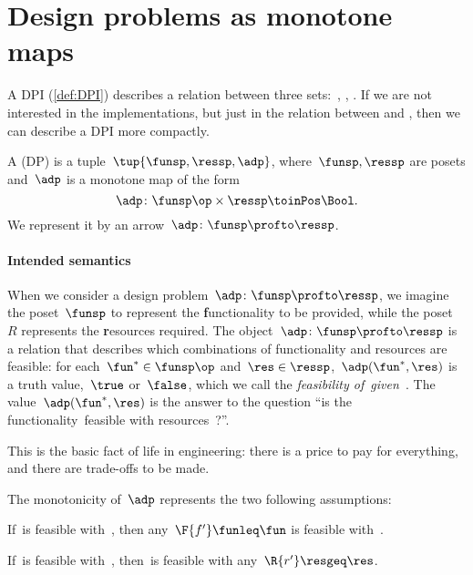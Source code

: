 
\section{Design problems as monotone maps}
\label{sec:dpdefinition}

A DPI (\cref{def:DPI}) describes a relation between three sets:~\funsp, \ressp, \impsp.
If we are not interested in the implementations, but just in the relation between \funsp and \ressp, then we can describe a DPI more compactly.

\begin{definition}
  \label{def:design-problem}
  A  (DP) is a tuple~$\tup{\funsp, \ressp, \adp}$,
  where~$\funsp, \ressp$ are posets and~$\adp$ is a monotone map of the form
  \begin{equation}
    \adp \colon  \funsp\op \times \ressp \toinPos \Bool.
  \end{equation}
  We represent it by an arrow~$\adp \colon \funsp \profto \ressp$.
\end{definition}

\paragraph{Intended semantics}
When we consider a design problem~$\adp\colon \funsp \profto \ressp$, we imagine the poset~$\funsp$ to represent the \textbf{f}unctionality to be provided, while the poset~$R$ represents the \textbf{r}esources required. The object~$\adp \colon \funsp \profto \ressp$ is a relation that describes which combinations of functionality and resources are feasible: for each~$\fun^* \in \funsp\op$ and~$\res \in \ressp$,~$\adp(\fun^*,\res)$ is a truth value,~$\true$ or~$\false$, which we call the \emph{feasibility of~\fun given~\res}. The value~$\adp(\fun^*,\res)$ is the answer to the question ``is the functionality~\fun feasible with resources~\res?''.

This is the basic fact of life in engineering: there is a price to pay for everything, and there are trade-offs to be made.

The monotonicity of~$\adp$ represents the two following assumptions:

\begin{compactenum}
  \item If~\fun is feasible with~\res, then any~$\F{f'} \funleq \fun$ is feasible with~\res.
  \item If~\fun is feasible with~\res, then~\fun is feasible with any~$\R{r'} \resgeq \res$.
\end{compactenum}

